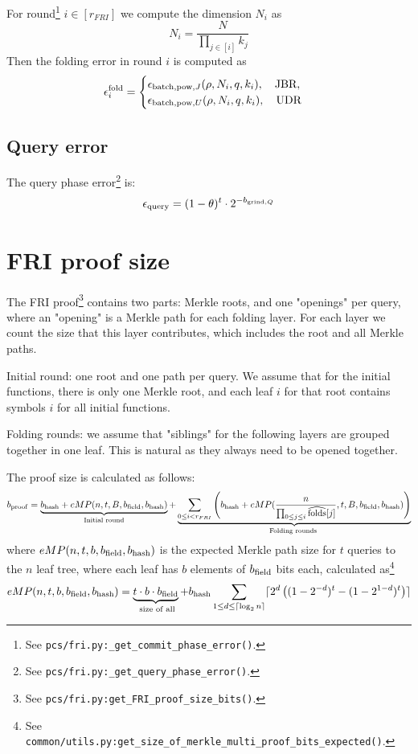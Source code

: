 For round\footnote{See \texttt{pcs/fri.py:\_get\_commit\_phase\_error()}.} $i\in[r_{FRI}]$ we compute the dimension $N_i$ as
$$
N_i = \frac{N}{\prod_{j\in[i]}k_j}
$$
Then the folding error in round $i$ is computed as
\begin{equation}
    \epsilon_{i}^{\mathrm{fold}} =
\begin{cases}
   \epsilon_{\mathrm{batch,pow},J} (\rho,N_i,q,k_i ),\quad \text{JBR}, \\
   \epsilon_{\mathrm{batch,pow},U} (\rho,N_i,q,k_i ),\quad \text{UDR}
\end{cases}
\end{equation}

\subsection{Query error}

The query phase error\footnote{See \texttt{pcs/fri.py:\_get\_query\_phase\_error()}.} is:
\begin{equation}
    \epsilon_{\mathrm{query}} = (1-\theta)^{t}\cdot 2^{-b_{\mathrm{grind},Q}}
\end{equation}

\newpage
\section{FRI proof size}

The FRI proof\footnote{See \texttt{pcs/fri.py:get\_FRI\_proof\_size\_bits()}.} contains two parts: Merkle roots, and one "openings" per query,
  where an "opening" is a Merkle path for each folding layer.
     For each layer we count the size that
     this layer contributes, which includes the root and all Merkle paths.

Initial round: one root and one path per query.
     We assume that for the initial functions, there is only one Merkle root, and
     each leaf $i$ for that root contains symbols $i$ for all initial functions.

    Folding rounds:
     we assume that "siblings" for the following layers are grouped together
     in one leaf. This is natural as they always need to be opened together.

The proof size is calculated as follows:
\begin{multline}
    b_{\mathrm{proof}} =   \underbrace{ b_{\mathrm{hash}}+  eMP(n,  t ,B,b_{\mathrm{field}},b_{\mathrm{hash}})}_{\text{Initial round}} + \underbrace{\sum_{0\leq i < r_{FRI} } \left(b_{\mathrm{hash}}+
      eMP(\frac{n}{\prod_{0\leq j \leq  i} \widehat{\mathrm{folds}}[j]},  t ,B,b_{\mathrm{field}},b_{\mathrm{hash}})\right)}_{\text{Folding rounds }}
    \end{multline}
where $eMP(n, t, b, b_{\mathrm{field}}, b_{\mathrm{hash}})$ is the expected Merkle path size for $t$ queries to the $n$ leaf tree,
where each leaf has $b$ elements of $b_{\mathrm{field}}$ bits each,
calculated as\footnote{See \texttt{common/utils.py:get\_size\_of\_merkle\_multi\_proof\_bits\_expected()}.}
\begin{equation}
    eMP(n,t, b,b_{\mathrm{field}},b_{\mathrm{hash}}) =   \underbrace{t\cdot b\cdot b_{\mathrm{field}}}_{\text{ size of all}}
    +b_{\mathrm{hash}}\sum_{1\leq d\leq \lceil \log_{2} n\rceil}\lceil 2^d\left((1-2^{-d})^t-(1-2^{1-d})^t\right)\rceil
\end{equation}